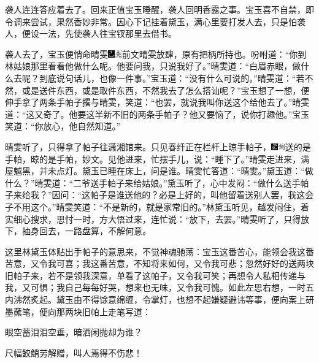袭人连连答应着去了。回来正值宝玉睡醒，袭人回明香露之事。宝玉喜不自禁，即令调来尝试，果然香妙非常。因心下记挂着黛玉，满心里要打发人去，只是怕袭人，便设一法，先使袭人往宝钗那里去借书。

袭人去了，宝玉便悄命晴雯{\includegraphics[width=3mm]{../Images/00003}\includegraphics[width=3mm]{../Images/00012}\footnotesize \kaishu 前文晴雯放肆，原有把柄所持也。}吩咐道：``你到林姑娘那里看看他做什么呢。他要问我，只说我好了。''晴雯道：``白眉赤眼，做什么去呢？到底说句话儿，也像一件事。''宝玉道：``没有什么可说的。''晴雯道：``若不然，或是送件东西，或是取件东西，不然我去了怎么搭讪呢？''宝玉想了一想，便伸手拿了两条手帕子撂与晴雯，笑道：``也罢，就说我叫你送这个给他去了。''晴雯道：``这又奇了。他要这半新不旧的两条手帕子？他又要恼了，说你打趣他。''宝玉笑道：``你放心，他自然知道。''

晴雯听了，只得拿了帕子往潇湘馆来。只见春纤正在栏杆上晾手帕子，{\includegraphics[width=3mm]{../Images/00006}\includegraphics[width=3mm]{../Images/00011}\footnotesize \kaishu 送的是手帕，晾的是手帕，妙文。}见他进来，忙摆手儿，说：``睡下了。''晴雯走进来，满屋魆黑，并未点灯。黛玉已睡在床上，问是谁。晴雯忙答道：``晴雯。''黛玉道：``做什么？''晴雯道：``二爷送手帕子来给姑娘。''黛玉听了，心中发闷：``做什么送手帕子来给我？''因问：``这帕子是谁送他的？必是上好的，叫他留着送别人罢，我这会子不用这个。''晴雯笑道：``不是新的，就是家常旧的。''林黛玉听见，越发闷住，着实细心搜求，思忖一时，方大悟过来，连忙说：``放下，去罢。''晴雯听了，只得放下，抽身回去，一路盘算，不解何意。

这里林黛玉体贴出手帕子的意思来，不觉神魂驰荡：宝玉这番苦心，能领会我这番苦意，又令我可喜；我这番苦意，不知将来如何，又令我可悲；忽然好好的送两块旧帕子来，若不是领我深意，单看了这帕子，又令我可笑；再想令人私相传递与我，又可惧；我自己每每好哭，想来也无味，又令我可愧。如此左思右想，一时五内沸然炙起。黛玉由不得馀意绵缠，令掌灯，也想不起嫌疑避讳等事，便向案上研墨蘸笔，便向那两块旧帕上走笔写道：

眼空蓄泪泪空垂，暗洒闲抛却为谁？

尺幅鲛鮹劳解赠，叫人焉得不伤悲！

